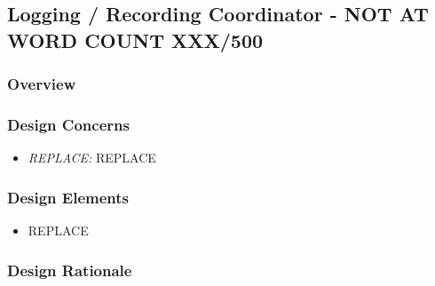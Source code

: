 \subsection{Logging / Recording Coordinator - NOT AT WORD COUNT XXX/500}
\subsubsection{Overview}

\subsubsection{Design Concerns}
\begin{itemize}
\item \textit{REPLACE:} REPLACE

\end{itemize}

\subsubsection{Design Elements}
\begin{itemize}
\item REPLACE
\end{itemize}

\subsubsection{Design Rationale}
